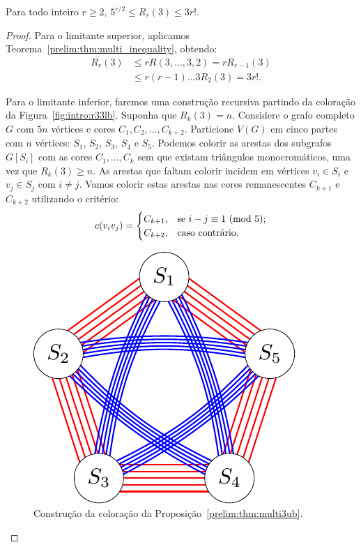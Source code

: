 \begin{theorem}
\label{prelim:thm:multi3ub} Para todo inteiro $r \geq 2$, $5^{r/2} \leq R_r(3) \leq 3 r!$.
\end{theorem}
\begin{proof}
Para o limitante superior, aplicamos Teorema~\ref{prelim:thm:multi_inequality}, obtendo:
\begin{align*}
R_{r}(3) &\leq rR(3,\dots,3,2) = rR_{r-1}(3) \\
&\leq r(r-1)\dots3 R_2(3) = 3r!.
\end{align*}

Para o limitante inferior, faremos uma construção recursiva partindo da coloração da Figura~\ref{fig:intro:r33lb}. Suponha que $R_k(3) = n$. Considere o grafo completo $G$ com $5n$ vértices e cores $C_1, C_2, \dots, C_{k+2}$. Particione $V(G)$ em cinco partes com $n$ vértices: $S_1$, $S_2$, $S_3$, $S_4$ e $S_5$.
Podemos colorir as arestas dos subgrafos $G[S_i]$ com as cores $C_1, \dots, C_k$ sem que existam triângulos monocromáticos, uma vez que $R_k(3) \geq n$. As arestas que faltam colorir incidem em vértices $v_i \in S_i$ e $v_j \in S_j$ com $i \neq j$. Vamos colorir estas arestas nas cores remanescentes $C_{k+1}$ e $C_{k+2}$ utilizando o critério:
\[c(v_i v_j) = \begin{cases}
  C_{k+1}, & \text{se } i - j \equiv 1 \ (\text{mod}\ 5); \\
  C_{k+2}, & \text{caso contrário}.
\end{cases}\]

\begin{figure}[H]
\centering
\includegraphics{figures/2_prelim_4_const}
\caption{Construção da coloração da Proposição~\ref{prelim:thm:multi3ub}.}
\label{prelim:fig:const}
\end{figure}



\end{proof}
